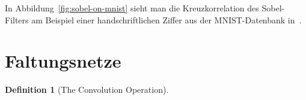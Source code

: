 \documentclass{article}
\theoremstyle{definition}
\newtheorem{definition}[theorem]{Definition}
\begin{document}
In Abbildung~\ref{fig:sobel-on-mnist} sieht man die Kreuzkorrelation des Sobel-Filters am Beispiel einer handschriftlichen Ziffer aus der MNIST-Datenbank in~\cite{lecun2010mnist}.


\section{Faltungsnetze}





\begin{definition}[The Convolution Operation]
    
\end{definition}

\clearpage          %
\thispagestyle{empty}

\end{document}
